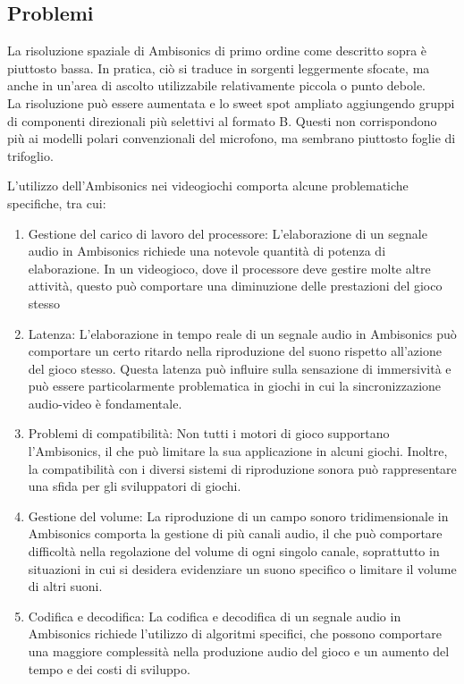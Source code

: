       \subsection{Problemi}
      La risoluzione spaziale di Ambisonics di primo ordine come descritto sopra è piuttosto bassa.
      In pratica, ciò si traduce in sorgenti leggermente sfocate, ma anche in un'area di ascolto utilizzabile relativamente piccola o punto debole.\\
      La risoluzione può essere aumentata e lo sweet spot ampliato aggiungendo gruppi di componenti direzionali più selettivi al formato B.
      Questi non corrispondono più ai modelli polari convenzionali del microfono, ma sembrano piuttosto foglie di trifoglio. 
      
      L'utilizzo dell'Ambisonics nei videogiochi comporta alcune problematiche specifiche, tra cui:

      \begin{enumerate}
            \item Gestione del carico di lavoro del processore:
            L'elaborazione di un segnale audio in Ambisonics richiede una notevole quantità di potenza di elaborazione.
            In un videogioco, dove il processore deve gestire molte altre attività,
            questo può comportare una diminuzione delle prestazioni del gioco stesso
            
            \item Latenza: L'elaborazione in tempo reale di un segnale audio in Ambisonics può comportare un certo ritardo nella riproduzione del suono rispetto all'azione del gioco stesso.
            Questa latenza può influire sulla sensazione di immersività e può essere particolarmente problematica in giochi in cui la sincronizzazione audio-video è fondamentale.
            
\item Problemi di compatibilità: Non tutti i motori di gioco supportano l'Ambisonics, il che può limitare la sua applicazione in alcuni giochi.
Inoltre, la compatibilità con i diversi sistemi di riproduzione sonora può rappresentare una sfida per gli sviluppatori di giochi.

\item Gestione del volume: La riproduzione di un campo sonoro tridimensionale in Ambisonics comporta la gestione di più canali audio, il che può comportare difficoltà nella regolazione del volume di ogni singolo canale, soprattutto in situazioni in cui si desidera evidenziare un suono specifico o limitare il volume di altri suoni.
  
\item Codifica e decodifica: La codifica e decodifica di un segnale audio in Ambisonics richiede l'utilizzo di algoritmi specifici, che possono comportare una maggiore complessità nella produzione audio del gioco e un aumento del tempo e dei costi di sviluppo.

\end{enumerate}

